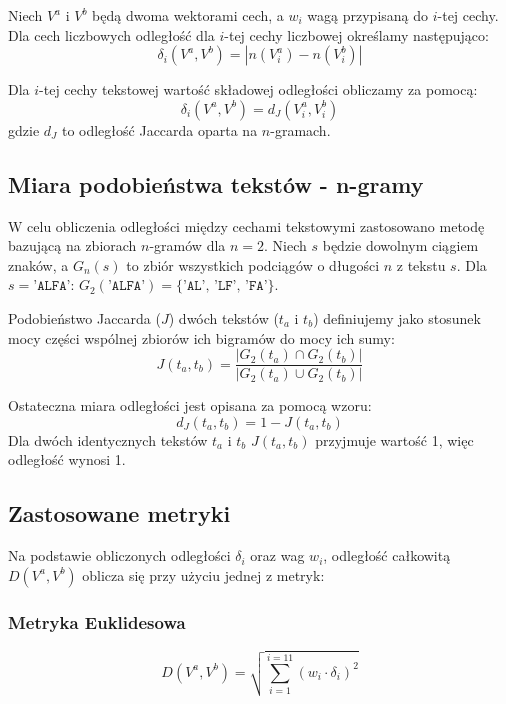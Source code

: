 \documentclass{article}
\begin{document}
	Niech \(V^a\) i \(V^b\) będą dwoma wektorami cech, a \(w_i\) wagą przypisaną do \(i\)-tej cechy. Dla cech liczbowych odległość dla \(i\)-tej cechy liczbowej określamy następująco:
	\begin{equation}
		\delta_i(V^a, V^b) = |n(V^a_i) - n(V^b_i)|
	\end{equation} 
	
	\noindent
	Dla \(i\)-tej cechy tekstowej wartość składowej odległości obliczamy za pomocą:
	\begin{equation}
		\delta_i(V^a, V^b) = d_J(V^a_i, V^b_i)
	\end{equation}
	gdzie \(d_J\) to odległość Jaccarda oparta na \(n\)-gramach.
	
	\subsection{Miara podobieństwa tekstów - n-gramy}
	W celu obliczenia odległości między cechami tekstowymi zastosowano metodę bazującą na zbiorach \(n\)-gramów dla \(n=2\). Niech \(s\) będzie dowolnym ciągiem znaków, a \(G_n(s)\) to zbiór wszystkich podciągów o długości \(n\) z tekstu \(s\). Dla \(s=\texttt{'ALFA'}\): \(G_2(\texttt{'ALFA'}) = \{\texttt{'AL', 'LF', 'FA'}\}\).
	
	Podobieństwo Jaccarda (\(J\)) dwóch tekstów (\(t_a\) i \(t_b\)) definiujemy jako stosunek mocy części wspólnej zbiorów ich bigramów do mocy ich sumy:
	\begin{equation}
		J(t_a, t_b) = \frac{|G_2(t_a) \cap G_2(t_b)|}{|G_2(t_a) \cup G_2(t_b)|}
	\end{equation}
	
	Ostateczna miara odległości jest opisana za pomocą wzoru:
	\begin{equation}
		d_J(t_a, t_b) = 1 - J(t_a, t_b)
	\end{equation}
	Dla dwóch identycznych tekstów \(t_a\) i \(t_b\) \(J(t_a,t_b)\) przyjmuje wartość 1, więc odległość wynosi 1.
	
	\subsection{Zastosowane metryki}
	Na podstawie obliczonych odległości \(\delta_i\) oraz wag \(w_i\), odległość całkowitą \(D(V^a,V^b)\) oblicza się przy użyciu jednej z metryk:
	
	\subsubsection{Metryka Euklidesowa}
	\begin{equation}
		D(V^a,V^b) = \sqrt{\sum_{i=1}^{i=11} (w_i \cdot \delta_i)^2}
	\end{equation}
	
\end{document}
